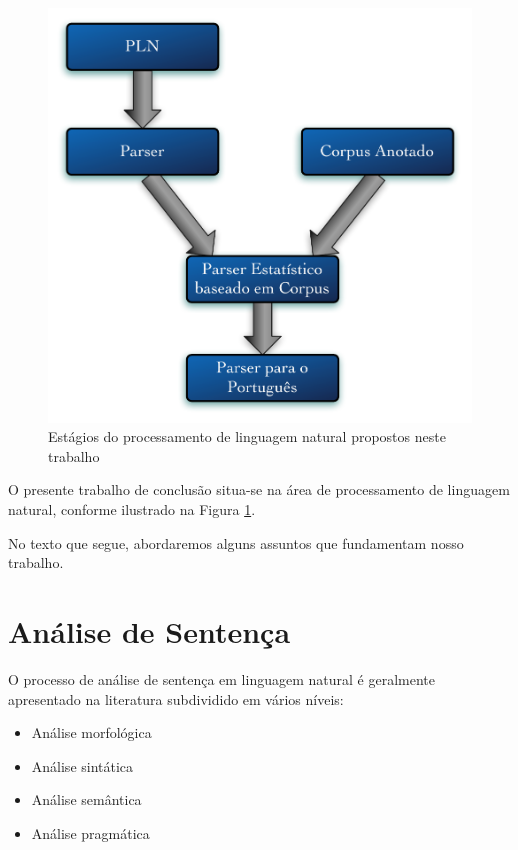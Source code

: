\begin{figure}
	\begin{center}
		\includegraphics[scale=0.5]{fases.pdf}
		\caption{\label{fases} Estágios do processamento de linguagem natural propostos neste trabalho}		
	\end{center}
\end{figure}

O presente trabalho de conclusão situa-se na área de processamento de linguagem natural, conforme ilustrado na Figura \ref{fases}.

No texto que segue, abordaremos alguns assuntos que fundamentam nosso trabalho.

\section{Análise de Sentença} %
\label{sec:analise_da_sentenca}

O processo de análise de sentença em linguagem natural é geralmente apresentado na literatura subdividido em vários níveis:

\begin{itemize}
	\item Análise morfológica
	\item Análise sintática
	\item Análise semântica
	\item Análise pragmática
\end{itemize}

